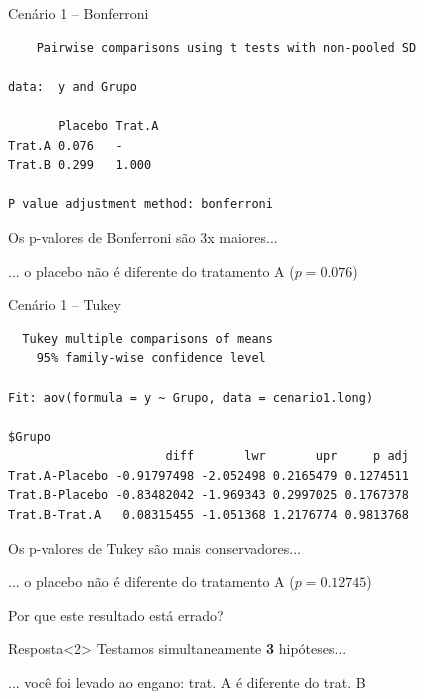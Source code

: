 \documentclass{beamer}
\begin{document}

\begin{frame}[fragile]{\scriptsize }
  \begin{exampleblock}{Cenário 1 -- Bonferroni}
    \scriptsize
\begin{verbatim}
	Pairwise comparisons using t tests with non-pooled SD 

data:  y and Grupo 

       Placebo Trat.A
Trat.A 0.076   -     
Trat.B 0.299   1.000 

P value adjustment method: bonferroni
\end{verbatim}
  \end{exampleblock}
  \begin{block}{}
    \small
    Os p-valores de Bonferroni são 3x maiores...

    \bigskip
    ... o placebo não é diferente do tratamento A ($p=0.076$)
  \end{block}
\end{frame}

\begin{frame}[fragile]{\scriptsize }
  \begin{exampleblock}{Cenário 1 -- Tukey}
    \scriptsize
\begin{verbatim}
  Tukey multiple comparisons of means
    95% family-wise confidence level

Fit: aov(formula = y ~ Grupo, data = cenario1.long)

$Grupo
                      diff       lwr       upr     p adj
Trat.A-Placebo -0.91797498 -2.052498 0.2165479 0.1274511
Trat.B-Placebo -0.83482042 -1.969343 0.2997025 0.1767378
Trat.B-Trat.A   0.08315455 -1.051368 1.2176774 0.9813768
\end{verbatim}
  \end{exampleblock}
  \begin{block}{}
    \small
    Os p-valores de Tukey são mais conservadores...

    \bigskip
    ... o placebo não é diferente do tratamento A ($p=0.12745$)
  \end{block}
\end{frame}


\begin{frame}{\scriptsize }
  \begin{center}
    Por que este resultado está errado?
  \end{center}

  \vfill
  \begin{block}{Resposta}<2>
    Testamos simultaneamente {\bf 3} hipóteses...

    \bigskip
    \small
    ... você foi levado ao engano: trat. A é diferente do trat. B
  \end{block}
\end{frame}
\end{document}
